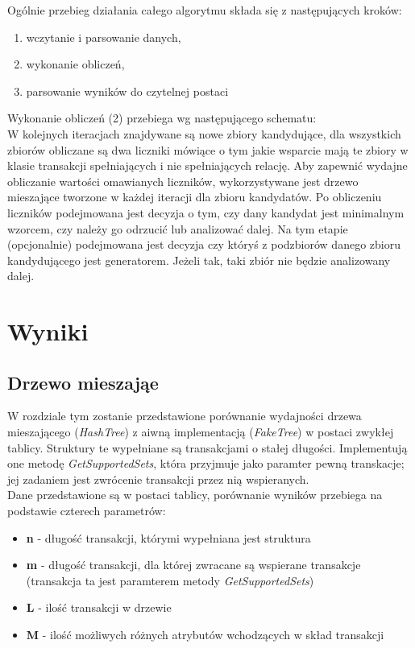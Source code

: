 \documentclass[a4paper,12pt]{article}
\begin{document}
Ogólnie przebieg działania całego algorytmu składa się z następujących kroków:

\begin{enumerate}
\item wczytanie i parsowanie danych,
\item wykonanie obliczeń,
\item parsowanie wyników do czytelnej postaci
\end{enumerate}

Wykonanie obliczeń (2) przebiega wg następującego schematu:\\

W kolejnych iteracjach znajdywane są nowe zbiory kandydujące, dla wszystkich zbiorów obliczane są dwa liczniki mówiące o tym jakie wsparcie mają te zbiory w klasie transakcji spełniających i nie spełniających relację. Aby zapewnić wydajne obliczanie wartości omawianych liczników, wykorzystywane jest drzewo mieszające tworzone w każdej iteracji dla zbioru kandydatów. Po obliczeniu liczników podejmowana jest decyzja o tym, czy dany kandydat
jest minimalnym wzorcem, czy należy go odrzucić lub analizować dalej. Na tym etapie (opcjonalnie) podejmowana jest decyzja czy któryś z podzbiorów danego zbioru kandydującego jest generatorem. Jeżeli tak, taki zbiór nie będzie analizowany dalej.

\section{Wyniki}

\subsection{Drzewo mieszająe}

W rozdziale tym zostanie przedstawione porównanie wydajności drzewa mieszającego (\textit{HashTree}) z aiwną implementacją (\textit{FakeTree}) w postaci zwykłej tablicy. Struktury te wypełniane są transakcjami o stałej długości. Implementują one metodę \textit{GetSupportedSets}, która przyjmuje jako paramter pewną transkacje; jej zadaniem jest zwrócenie transakcji przez nią wspieranych. \\
Dane przedstawione są w postaci tablicy, porównanie wyników przebiega na podstawie czterech parametrów:
\begin{itemize}
\item {\bf n} - długość transakcji, którymi wypełniana jest struktura
\item {\bf m} - długość transakcji, dla której zwracane są wspierane transakcje (transakcja ta jest paramterem metody \textit{GetSupportedSets})
\item {\bf L} - ilość transakcji w drzewie
\item {\bf M} - ilość możliwych różnych atrybutów wchodzących w skład transakcji
\end{itemize}
\end{document}
